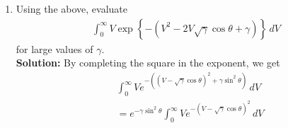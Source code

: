 \documentclass[journal,8pt,onecolumn]{IEEEtran}
\providecommand{\sbrak}[1]{\ensuremath{{}\left[#1\right]}}
\providecommand{\brak}[1]{\ensuremath{\left(#1\right)}}
\providecommand{\cbrak}[1]{\ensuremath{\left\{#1\right\}}}
\newcommand{\solution}{\noindent \textbf{Solution: }}
\begin{document}
\begin{enumerate}
\begin{enumerate}[label=(\alph{enumii})]
%
\begin{align}
\label{eq:v_minus_alpha_integ}
\lim_{\alpha \rightarrow \infty}\int_{0}^{\infty}\brak{V-\alpha }e^{-\brak{V-\alpha}^2 }\,dV
&= 0
\\
\label{eq:no_v_minus_alpha_integ}
\lim_{\alpha \rightarrow \infty}\int_{0}^{\infty} e^{-\brak{V-\alpha}^2 }\,dV
&=  \sqrt{\pi}
\end{align}\\
\solution For \eqref{eq:v_minus_alpha_integ}, let $(V-\alpha)^2 = t$. Then
\begin{equation*}
	2(V-\alpha)dV = dt
\end{equation*} 
Changing the integral in terms of $t$,
\begin{align*}
	\lim_{\alpha \rightarrow \infty}\frac{1}{2}\int_{-\alpha^2}^{\infty}e^{-t}\,dt &= \lim_{\alpha \rightarrow \infty}\frac{1}{2}\sbrak{-e^{-t}}_{\alpha^2}^{\infty}\\
	&= \lim_{\alpha \rightarrow \infty}\frac{1}{2}e^{-\alpha^2}\\
	&= 0
\end{align*}
For \eqref{eq:no_v_minus_alpha_integ}, let $\brak{V-\alpha} = \frac{k}{\sqrt{2}}$. Then
\begin{equation*}
	dV = \frac{dk}{\sqrt{2}} 
\end{equation*} 
Changing the integral in terms of $k$,
\begin{align*}
	\lim_{\alpha \rightarrow \infty}\frac{1}{\sqrt{2}}\int_{-\sqrt{2}\alpha}^{\infty} e^{-\frac{k^2}{2}}\,dk &= \sqrt{\pi}\lim_{\alpha \rightarrow \infty}\frac{1}{\sqrt{2\pi}}\int_{-\sqrt{2}\alpha}^{\infty} e^{-\frac{k^2}{2}}\,dk\\
	&= \sqrt{\pi}\frac{1}{\sqrt{2\pi}}\int_{-\infty}^{\infty} e^{-\frac{k^2}{2}}\,dk\\
	&= \sqrt{\pi}
\end{align*}
%
\item 
Using the above, evaluate
%
\begin{align}
\int_{0}^{\infty}V\exp\cbrak{-\brak{V^2 - 2V \sqrt{\gamma}\cos \theta +\gamma}}\,dV
\end{align}
%
for large values of $\gamma$.\\
\solution By completing the square in the exponent, we get
\begin{align*}
	&\int_{0}^{\infty}Ve^{-\brak{(V - \sqrt{\gamma}\cos \theta)^2 +\gamma\sin^2 \theta}}\,dV\\
	&=e^{-\gamma\sin^2 \theta}\int_{0}^{\infty}Ve^{-\brak{V - \sqrt{\gamma}\cos \theta}^2}\,dV\\

\end{align*}
\end{enumerate}
\end{enumerate}
\end{document}
